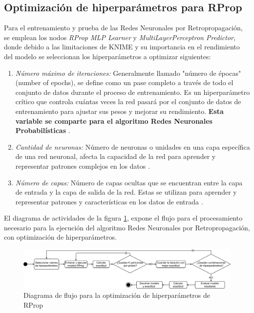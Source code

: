 \subsection{Optimización de hiperparámetros para RProp}
Para el entrenamiento y prueba de las Redes Neuronales por Retropropagación, se emplean los nodos \textit{RProp MLP Learner} y \textit{MultiLayerPerceptron Predictor}, donde debido a las limitaciones de KNIME y su importancia en el rendimiento del modelo se seleccionan los hiperparámetros a optimizar siguientes:
	\begin{enumerate}
		\item \textit{Número máximo de iteraciones:} Generalmente llamado "número de épocas" (number of epochs), se define como un pase completo a través de todo el conjunto de datos durante el proceso de entrenamiento. Es un hiperparámetro crítico que controla cuántas veces la red pasará por el conjunto de datos de entrenamiento para ajustar sus pesos y mejorar su rendimiento. \textbf{Esta variable se comparte para el algoritmo Redes Neuronales Probabilísticas} \citep{montavon2012neural}.
		\item \textit{Cantidad de neuronas:} Número de neuronas o unidades en una capa específica de una red neuronal, afecta la capacidad de la red para aprender y representar patrones complejos en los datos \citep{montavon2012neural}.
		\item \textit{Número de capas:} Número de capas ocultas que se encuentran entre la capa de entrada y la capa de salida de la red. Estas se utilizan para aprender y representar patrones y características en los datos de entrada \citep{montavon2012neural}.
	\end{enumerate}

El diagrama de actividades de la figura \ref{fig:optimizacion-rprop}, expone el flujo para el procesamiento necesario para la ejecución del algoritmo Redes Neuronales por Retropropagación, con optimización de hiperparámetros.

\begin{figure}[H]
	\centering
	\includegraphics[width=1\linewidth]{"figuras/capi 2/hpo/Optimizacion RProp"}
	\caption{Diagrama de flujo para la optimización de hiperparámetros de RProp}
	\label{fig:optimizacion-rprop}
\end{figure}


